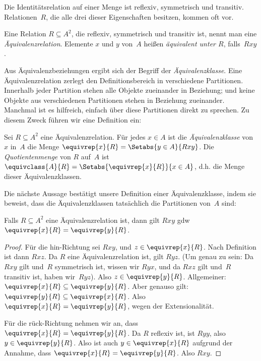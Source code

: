 \documentclass[../../../include/open-logic-section]{subfiles}
\begin{document}


Die Identitätsrelation auf einer Menge ist reflexiv, symmetrisch und
transitiv. Relationen~$R$, die alle drei dieser Eigenschaften besitzen, 
kommen oft vor.

\begin{defn}[Äquivalenzrelation] 
Eine Relation ${R \subseteq A^2}$, die reflexiv, symmetrisch und
transitiv ist, nennt man eine \emph{Äquivalenzrelation}. Elemente $x$
und $y$ von~$A$ heißen \emph{äquivalent unter $R$}, falls~$Rxy$.
\end{defn}

Aus Äquivalenzbeziehungen ergibt sich der Begriff der \emph{Äquivalenzklasse}.
Eine Äquivalenzrelation \glqq zerlegt\grqq{} den Definitionsbereich in
verschiedene Partitionen. Innerhalb jeder Partition stehen alle Objekte zueinander 
in Beziehung; und keine Objekte aus verschiedenen Partitionen
stehen in Beziehung zueinander. Manchmal ist es hilfreich, einfach über
diese Partitionen direkt zu sprechen. Zu diesem Zweck führen wir eine
Definition ein:

\begin{defn}
Sei $R \subseteq A^2$ eine Äquivalenzrelation. Für jedes $x \in A$
ist die \emph{Äquivalenzklasse} von $x$ in~$A$ die Menge ${\equivrep{x}{R}
= \Setabs{y \in A}{Rxy}}$. Die \emph{Quotientenmenge} von $R$ auf~$A$ ist
$\equivclass{A}{R} = \Setabs{\equivrep{x}{R}}{x \in A}$, d.h. die Menge
dieser Äquivalenzklassen. 
\end{defn}

Die nächste Aussage bestätigt unsere Definition einer Äquivalenzklasse,
indem sie beweist, dass die Äquivalenzklassen tatsächlich die Partitionen von~$A$ sind:

\begin{prop}
Falls $R \subseteq A^2$ eine Äquivalenzrelation ist, dann gilt $Rxy$ gdw
$\equivrep{x}{R} = \equivrep{y}{R}$.
\end{prop}

\begin{proof}
Für die hin-Richtung sei $Rxy$, und $z \in
\equivrep{x}{R}$. Nach Definition ist dann $Rxz$. Da $R$ eine
Äquivalenzrelation ist, gilt $Ryz$. (Um genau zu sein: Da $Rxy$ gilt und~$R$
symmetrisch ist, wissen wir $Ryx$, und da $Rxz$ gilt und~$R$ transitiv ist,
haben wir~$Ryz$). Also $z \in \equivrep{y}{R}$. Allgemeiner:
$\equivrep{x}{R} \subseteq \equivrep{y}{R}$. Aber genauso gilt:
$\equivrep{y}{R} \subseteq \equivrep{x}{R}$. Also $\equivrep{x}{R} =
\equivrep{y}{R}$, wegen der Extensionalität.

Für die rück-Richtung nehmen wir an, dass $\equivrep{x}{R} =
\equivrep{y}{R}$. Da $R$ reflexiv ist, ist $Ryy$, also $y \in
\equivrep{y}{R}$. Also ist auch $y \in \equivrep{x}{R}$ aufgrund der Annahme,
dass $\equivrep{x}{R} = \equivrep{y}{R}$. Also $Rxy$.
\end{proof}
\end{document}
